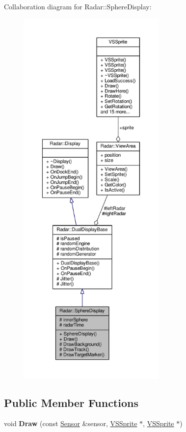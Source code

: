 Collaboration diagram for Radar\+:\+:Sphere\+Display\+:
\nopagebreak
\begin{figure}[H]
\begin{center}
\leavevmode
\includegraphics[height=550pt]{df/de5/classRadar_1_1SphereDisplay__coll__graph}
\end{center}
\end{figure}
\subsection*{Public Member Functions}
\begin{DoxyCompactItemize}
\item 
void {\bfseries Draw} (const \hyperlink{classRadar_1_1Sensor}{Sensor} \&sensor, \hyperlink{classVSSprite}{V\+S\+Sprite} $\ast$, \hyperlink{classVSSprite}{V\+S\+Sprite} $\ast$)\hypertarget{classRadar_1_1SphereDisplay_a169984b98fedb6dd57785bdbaa118c45}{}\label{classRadar_1_1SphereDisplay_a169984b98fedb6dd57785bdbaa118c45}

\end{DoxyCompactItemize}

